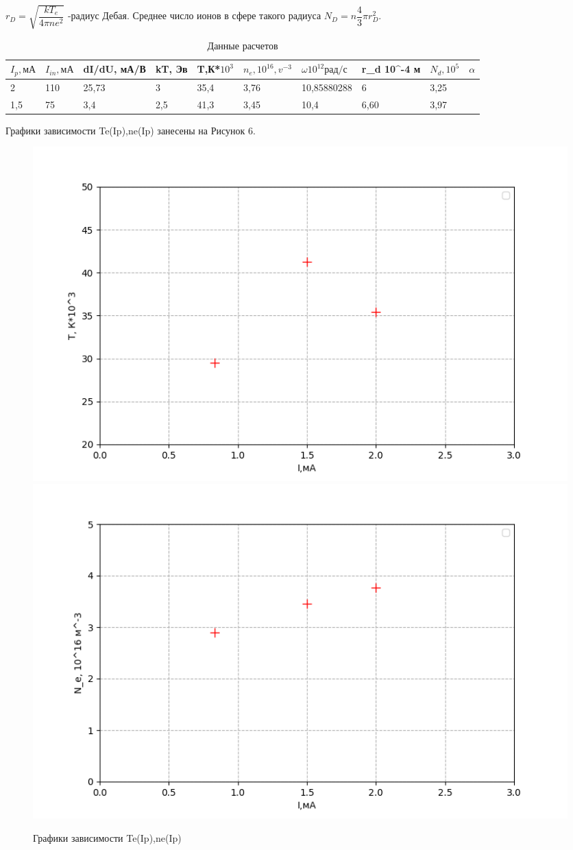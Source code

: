\documentclass[a4paper,12pt]{article}
\begin{document}
$r_D = \sqrt{\dfrac{kT_e}{4\pi n e^2}}$ -радиус Дебая. Среднее число ионов в сфере такого радиуса $N_D = n\dfrac{4}{3}\pi r_D^2.$\\

\begin{table}[!ht]
    \centering
    \begin{tabular}{|l|l|l|l|l|l|l|l|l|l|}
    \hline
        $I_p, мА$ & $I_{in}, мА$ & dI/dU, мА/В & kT, Эв & T,К*$10^3 $& $n_e, 10^{16}, v^{-3}$ & $\omega 10^{12} рад/с$& r_d 10^{-4} м & $N_d, 10^5$ & $\alpha$ \\ \hline
        2 & 110 & 25,73 & 3 & 35,4 & 3,76 & 10,85880288 & 6 & 3,25 & ~ \\ \hline
        1,5 & 75 & 3,4 & 2,5 & 41,3 & 3,45 & 10,4 & 6,60 & 3,97 & ~ \\ \hline
    \end{tabular}
    \caption{Данные расчетов}
\end{table}

Графики зависимости Te(Ip),ne(Ip) занесены на Рисунок 6.\\

\begin{figure}[!ht]
\begin{center}
\includegraphics[scale=0.6]{rty1.png}
\includegraphics[scale=0.6]{кен2.png}
\caption{Графики зависимости Te(Ip),ne(Ip)}
\end{center}
\end{figure}	
\end{document}
